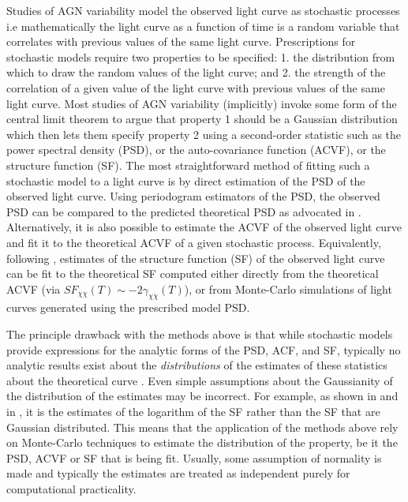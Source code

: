 \documentclass[a4paper,fleqn,usenatbib]{mnras}
\begin{document}
Studies of AGN variability model the observed light curve as stochastic processes i.e mathematically the light curve as a function of time is a random variable that correlates with previous values of the same light curve. Prescriptions for stochastic models require two properties to be specified: 1. the distribution from which to draw the random values of the light curve; and 2. the strength of the correlation of a given value of the light curve with previous values of the same light curve. Most studies of AGN variability (implicitly) invoke some form of the central limit theorem to argue that property 1 should be a Gaussian distribution which then lets them specify property 2 using a second-order statistic such as the power spectral density (PSD), or the auto-covariance function (ACVF), or the structure function (SF). The most straightforward method of fitting such a stochastic model to a light curve is by direct estimation of the PSD of the observed light curve. Using periodogram estimators of the PSD, the observed PSD can be compared to the predicted theoretical PSD as advocated in \citet*{Uttley02}. Alternatively, it is also possible to estimate the ACVF of the observed light curve and fit it to the theoretical ACVF of a given stochastic process. Equivalently, following \citet*{Kasliwal15}, estimates of the structure function (SF) of the observed light curve can be fit to the theoretical SF computed either directly from the theoretical ACVF (via $SF_{\chi\chi}(T) \sim -2\gamma_{\chi\chi}(T)$), or from Monte-Carlo simulations of light curves generated using the prescribed model PSD.

The principle drawback with the methods above is that while stochastic models provide expressions for the analytic forms of the PSD, ACF, and SF, typically no analytic results exist about the \textit{distributions} of the estimates of these statistics about the theoretical curve \citep{BrockwellDavisITSF}. Even simple assumptions about the Gaussianity of the distribution of the estimates may be incorrect. For example, as shown in \citet*{Emm10} and in \citet{Kasliwal15}, it is the estimates of the logarithm of the SF rather than the SF that are Gaussian distributed. This means that the application of the methods above rely on Monte-Carlo techniques to estimate the distribution of the property, be it the PSD, ACVF or SF that is being fit. Usually, some assumption of normality is made and typically the estimates are treated as independent purely for computational practicality. 
\end{document}
